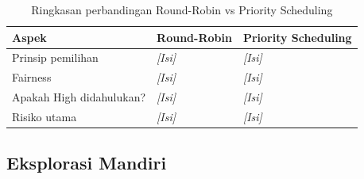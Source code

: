 \begin{enumerate}
	      \begin{table}[htbp]
		      \centering
		      \caption{Ringkasan perbandingan Round-Robin vs Priority Scheduling}
		      \begin{tabulary}{\textwidth}{|l|L|L|}
			      \hline
			      \textbf{Aspek} & \textbf{Round-Robin} & \textbf{Priority Scheduling} \\ \hline
			      Prinsip pemilihan
			      & \textit{[Isi]} & \textit{[Isi]} \\ \hline
			      Fairness
			      & \textit{[Isi]} & \textit{[Isi]} \\ \hline
			      Apakah High didahulukan?
			      & \textit{[Isi]} & \textit{[Isi]} \\ \hline
			      Risiko utama
			      & \textit{[Isi]} & \textit{[Isi]} \\ \hline
		      \end{tabulary}
	      \end{table}

\end{enumerate}

\subsection{Eksplorasi Mandiri}

